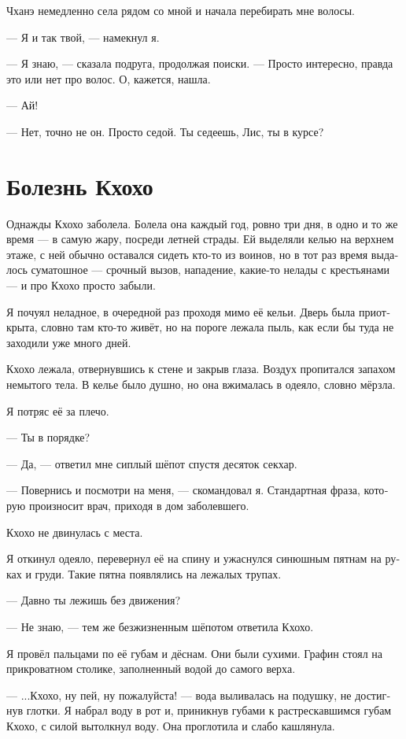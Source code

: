 \documentclass[a4paper,12pt,fleqn]{book}\usepackage{cooltooltips}\usepackage{polyglossia}\setdefaultlanguage[babelshorthands=true]{russian}\setotherlanguage{english}\defaultfontfeatures{Ligatures=TeX,Mapping=tex-text} \usepackage{xcolor}\definecolor{lightgray}{HTML}{bbbbbb}\color{lightgray}\newcommand{\ml}[3]{\textenglish{\textcolor{black}{#3}}}
\begin{document}
{Чханэ немедленно села рядом со мной и начала перебирать мне волосы.

--- Я и так твой, --- намекнул я.

--- Я знаю, --- сказала подруга, продолжая поиски.
--- Просто интересно, правда это или нет про волос.
О, кажется, нашла.

--- Ай!

--- Нет, точно не он.
Просто седой.
Ты седеешь, Лис, ты в курсе?

\section{Болезнь Кхохо}

Однажды Кхохо заболела.
Болела она каждый год, ровно три дня, в одно и то же время --- в самую жару, посреди летней страды.
Ей выделяли келью на верхнем этаже, с ней обычно оставался сидеть кто-то из воинов, но в тот раз время выдалось суматошное --- срочный вызов, нападение, какие-то нелады с крестьянами --- и про Кхохо просто забыли.

Я почуял неладное, в очередной раз проходя мимо её кельи.
Дверь была приоткрыта, словно там кто-то живёт, но на пороге лежала пыль, как если бы туда не заходили уже много дней.

Кхохо лежала, отвернувшись к стене и закрыв глаза.
Воздух пропитался запахом немытого тела.
В келье было душно, но она вжималась в одеяло, словно мёрзла.

Я потряс её за плечо.

--- Ты в порядке?

--- Да, --- ответил мне сиплый шёпот спустя десяток секхар.

--- Повернись и посмотри на меня, --- скомандовал я.
Стандартная фраза, которую произносит врач, приходя в дом заболевшего.

Кхохо не двинулась с места.

Я откинул одеяло, перевернул её на спину и ужаснулся синюшным пятнам на руках и груди.
Такие пятна появлялись на лежалых трупах.

--- Давно ты лежишь без движения?

--- Не знаю, --- тем же безжизненным шёпотом ответила Кхохо.

Я провёл пальцами по её губам и дёснам.
Они были сухими.
Графин стоял на прикроватном столике, заполненный водой до самого верха.

---  ...Кхохо, ну пей, ну пожалуйста! --- вода выливалась на подушку, не достигнув глотки.
Я набрал воду в рот и, приникнув губами к растрескавшимся губам Кхохо, с силой вытолкнул воду.
Она проглотила и слабо кашлянула.

}
\end{document}
